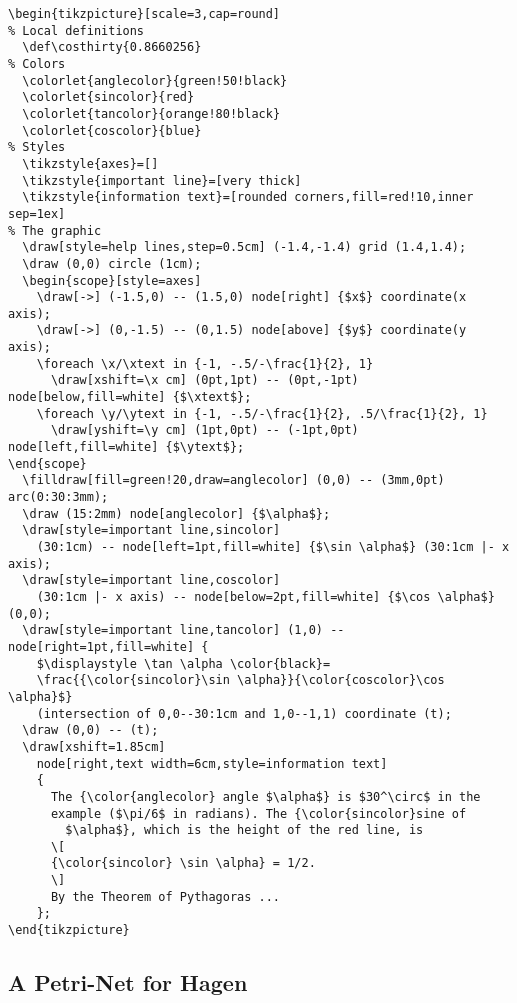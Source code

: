 \begin{lstlisting}
\begin{tikzpicture}[scale=3,cap=round]
% Local definitions
  \def\costhirty{0.8660256}
% Colors
  \colorlet{anglecolor}{green!50!black}
  \colorlet{sincolor}{red}
  \colorlet{tancolor}{orange!80!black}
  \colorlet{coscolor}{blue}
% Styles
  \tikzstyle{axes}=[]
  \tikzstyle{important line}=[very thick]
  \tikzstyle{information text}=[rounded corners,fill=red!10,inner sep=1ex]
% The graphic
  \draw[style=help lines,step=0.5cm] (-1.4,-1.4) grid (1.4,1.4);
  \draw (0,0) circle (1cm);
  \begin{scope}[style=axes]
    \draw[->] (-1.5,0) -- (1.5,0) node[right] {$x$} coordinate(x axis);
    \draw[->] (0,-1.5) -- (0,1.5) node[above] {$y$} coordinate(y axis);
    \foreach \x/\xtext in {-1, -.5/-\frac{1}{2}, 1}
      \draw[xshift=\x cm] (0pt,1pt) -- (0pt,-1pt) node[below,fill=white] {$\xtext$};
    \foreach \y/\ytext in {-1, -.5/-\frac{1}{2}, .5/\frac{1}{2}, 1}
      \draw[yshift=\y cm] (1pt,0pt) -- (-1pt,0pt) node[left,fill=white] {$\ytext$};
\end{scope}
  \filldraw[fill=green!20,draw=anglecolor] (0,0) -- (3mm,0pt) arc(0:30:3mm);
  \draw (15:2mm) node[anglecolor] {$\alpha$};
  \draw[style=important line,sincolor]
    (30:1cm) -- node[left=1pt,fill=white] {$\sin \alpha$} (30:1cm |- x axis);
  \draw[style=important line,coscolor]
    (30:1cm |- x axis) -- node[below=2pt,fill=white] {$\cos \alpha$} (0,0);
  \draw[style=important line,tancolor] (1,0) -- node[right=1pt,fill=white] {
    $\displaystyle \tan \alpha \color{black}=
    \frac{{\color{sincolor}\sin \alpha}}{\color{coscolor}\cos \alpha}$}
    (intersection of 0,0--30:1cm and 1,0--1,1) coordinate (t);
  \draw (0,0) -- (t);
  \draw[xshift=1.85cm]
    node[right,text width=6cm,style=information text]
    {
      The {\color{anglecolor} angle $\alpha$} is $30^\circ$ in the
      example ($\pi/6$ in radians). The {\color{sincolor}sine of
        $\alpha$}, which is the height of the red line, is
      \[
      {\color{sincolor} \sin \alpha} = 1/2.
      \]
      By the Theorem of Pythagoras ...
    };
\end{tikzpicture}
\end{lstlisting}



\subsection{A Petri-Net for Hagen}
\label{sec:petri-net-hagen}

